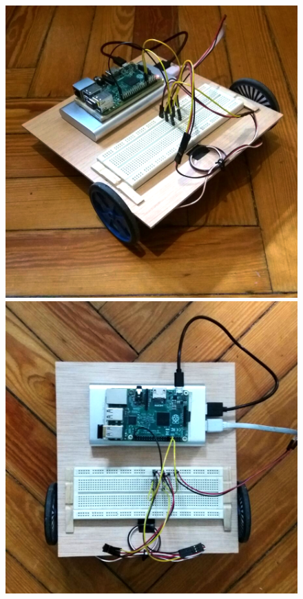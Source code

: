 \documentclass[11pt, a4paper]{article}
\begin{document}
	\begin{figure}[htbp]
	\centering
	{\begin{minipage}{0.31\linewidth}
		\centering
		\includegraphics[width=\textwidth]{robglob}
	\end{minipage}
	\hfill
	\begin{minipage}{0.31\linewidth}
		\centering
		\includegraphics[width=\textwidth]{robtop}

\end{minipage}}
\end{figure}
\end{document}

